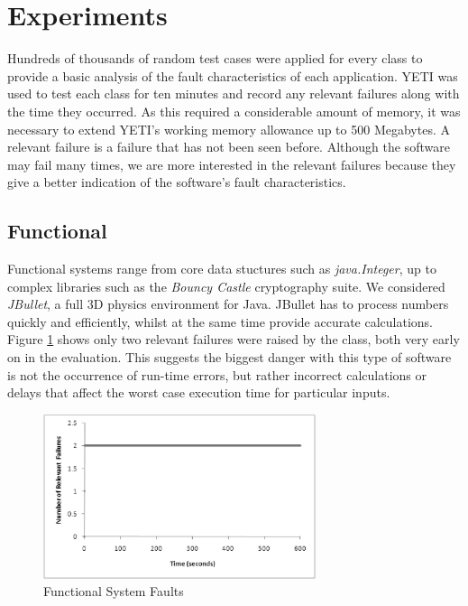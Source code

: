 \documentclass[runningheads,a4paper]{llncs}
\begin{document}
\section{Experiments}
Hundreds of thousands of random test cases were applied for every class to provide a basic analysis of the fault characteristics of each application. YETI was used to test each class for ten minutes and record any relevant failures along with the time they occurred. As this required a considerable amount of memory, it was necessary to extend YETI's working memory allowance up to 500 Megabytes. A relevant failure is a failure that has not been seen before. Although the software may fail many times, we are more interested in the relevant failures because they give a better indication of the software's fault characteristics.


\subsection*{Functional}
Functional systems range from core data stuctures such as \emph{java.Integer}, up to complex libraries such as the \emph{Bouncy Castle} cryptography suite. We considered \emph{JBullet}, a full 3D physics environment for Java. JBullet has to process numbers quickly and efficiently, whilst at the same time provide accurate calculations. Figure \ref{functional} shows only two relevant failures were raised by the class, both very early on in the evaluation. This suggests the biggest danger with this type of software is not the occurrence of run-time errors, but rather incorrect calculations or delays that affect the worst case execution time for particular inputs.
\begin{figure}[!h]
\centering
\includegraphics[width=80mm]{figures/functional.eps}
\caption{Functional System Faults}
\label{functional}
\end{figure}
\end{document}

